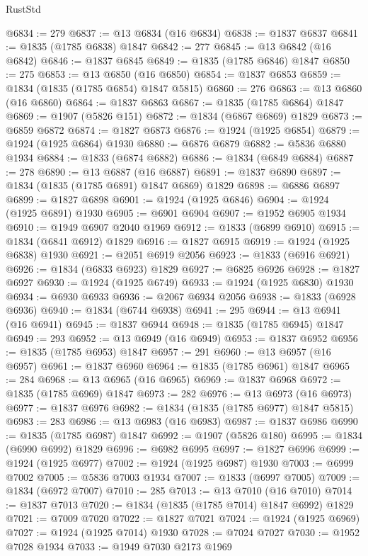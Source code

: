 \begin{lexlean}{RustStd}
\begin{coremodule}
@6834 := 279
@6837 := @13 @6834 (@16 @6834)
@6838 := @1837 @6837
@6841 := @1835 (@1785 @6838) @1847
@6842 := 277
@6845 := @13 @6842 (@16 @6842)
@6846 := @1837 @6845
@6849 := @1835 (@1785 @6846) @1847
@6850 := 275
@6853 := @13 @6850 (@16 @6850)
@6854 := @1837 @6853
@6859 := @1834 (@1835 (@1785 @6854) @1847 @5815)
@6860 := 276
@6863 := @13 @6860 (@16 @6860)
@6864 := @1837 @6863
@6867 := @1835 (@1785 @6864) @1847
@6869 := @1907 (@5826 @151)
@6872 := @1834 (@6867 @6869) @1829
@6873 := @6859 @6872
@6874 := @1827 @6873
@6876 := @1924 (@1925 @6854)
@6879 := @1924 (@1925 @6864) @1930
@6880 := @6876 @6879
@6882 := @5836 @6880 @1934
@6884 := @1833 (@6874 @6882)
@6886 := @1834 (@6849 @6884)
@6887 := 278
@6890 := @13 @6887 (@16 @6887)
@6891 := @1837 @6890
@6897 := @1834 (@1835 (@1785 @6891) @1847 @6869) @1829
@6898 := @6886 @6897
@6899 := @1827 @6898
@6901 := @1924 (@1925 @6846)
@6904 := @1924 (@1925 @6891) @1930
@6905 := @6901 @6904
@6907 := @1952 @6905 @1934
@6910 := @1949 @6907 @2040 @1969
@6912 := @1833 (@6899 @6910)
@6915 := @1834 (@6841 @6912) @1829
@6916 := @1827 @6915
@6919 := @1924 (@1925 @6838) @1930
@6921 := @2051 @6919 @2056
@6923 := @1833 (@6916 @6921)
@6926 := @1834 (@6833 @6923) @1829
@6927 := @6825 @6926
@6928 := @1827 @6927
@6930 := @1924 (@1925 @6749)
@6933 := @1924 (@1925 @6830) @1930
@6934 := @6930 @6933
@6936 := @2067 @6934 @2056
@6938 := @1833 (@6928 @6936)
@6940 := @1834 (@6744 @6938)
@6941 := 295
@6944 := @13 @6941 (@16 @6941)
@6945 := @1837 @6944
@6948 := @1835 (@1785 @6945) @1847
@6949 := 293
@6952 := @13 @6949 (@16 @6949)
@6953 := @1837 @6952
@6956 := @1835 (@1785 @6953) @1847
@6957 := 291
@6960 := @13 @6957 (@16 @6957)
@6961 := @1837 @6960
@6964 := @1835 (@1785 @6961) @1847
@6965 := 284
@6968 := @13 @6965 (@16 @6965)
@6969 := @1837 @6968
@6972 := @1835 (@1785 @6969) @1847
@6973 := 282
@6976 := @13 @6973 (@16 @6973)
@6977 := @1837 @6976
@6982 := @1834 (@1835 (@1785 @6977) @1847 @5815)
@6983 := 283
@6986 := @13 @6983 (@16 @6983)
@6987 := @1837 @6986
@6990 := @1835 (@1785 @6987) @1847
@6992 := @1907 (@5826 @180)
@6995 := @1834 (@6990 @6992) @1829
@6996 := @6982 @6995
@6997 := @1827 @6996
@6999 := @1924 (@1925 @6977)
@7002 := @1924 (@1925 @6987) @1930
@7003 := @6999 @7002
@7005 := @5836 @7003 @1934
@7007 := @1833 (@6997 @7005)
@7009 := @1834 (@6972 @7007)
@7010 := 285
@7013 := @13 @7010 (@16 @7010)
@7014 := @1837 @7013
@7020 := @1834 (@1835 (@1785 @7014) @1847 @6992) @1829
@7021 := @7009 @7020
@7022 := @1827 @7021
@7024 := @1924 (@1925 @6969)
@7027 := @1924 (@1925 @7014) @1930
@7028 := @7024 @7027
@7030 := @1952 @7028 @1934
@7033 := @1949 @7030 @2173 @1969

\end{coremodule}
\end{lexlean}
